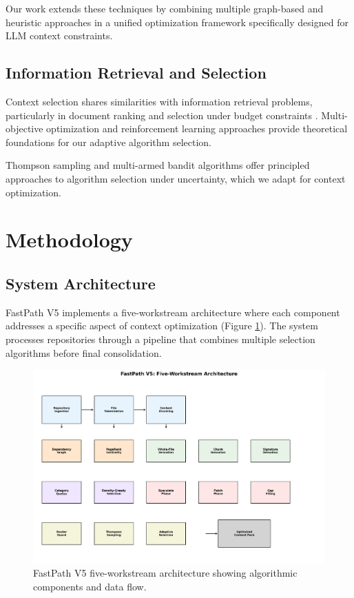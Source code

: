 \documentclass[conference]{IEEEtran}
\begin{document}
Our work extends these techniques by combining multiple graph-based and heuristic approaches in a unified optimization framework specifically designed for LLM context constraints.

\subsection{Information Retrieval and Selection}
Context selection shares similarities with information retrieval problems, particularly in document ranking and selection under budget constraints \cite{manning2008introduction}. Multi-objective optimization \cite{deb2001multi} and reinforcement learning approaches \cite{sutton2018reinforcement} provide theoretical foundations for our adaptive algorithm selection.

Thompson sampling \cite{thompson1933likelihood} and multi-armed bandit algorithms \cite{auer2002finite} offer principled approaches to algorithm selection under uncertainty, which we adapt for context optimization.

\section{Methodology}

\subsection{System Architecture}

FastPath V5 implements a five-workstream architecture where each component addresses a specific aspect of context optimization (Figure \ref{fig:architecture}). The system processes repositories through a pipeline that combines multiple selection algorithms before final consolidation.

\begin{figure}[t]
\centering
\includegraphics[width=\columnwidth]{figures/system_architecture.png}
\caption{FastPath V5 five-workstream architecture showing algorithmic components and data flow.}
\label{fig:architecture}
\end{figure}
\end{document}
